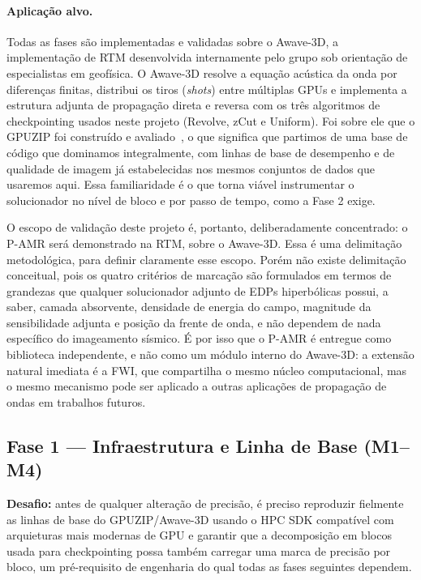\documentclass[12pt,a4paper]{article}
\newcommand{\pamr}{P\nobreakdash-AMR}
\begin{document}
\paragraph{Aplicação alvo.} Todas as fases são implementadas e validadas
sobre o Awave-3D, a implementação de RTM desenvolvida internamente pelo
grupo sob orientação de especialistas em geofísica. O Awave-3D resolve a
equação acústica da onda por diferenças finitas, distribui os tiros
(\emph{shots}) entre múltiplas GPUs e implementa a estrutura adjunta de
propagação direta e reversa com os três algoritmos de checkpointing usados
neste projeto (Revolve, zCut e Uniform). Foi sobre ele que o GPUZIP foi
construído e avaliado~\cite{maltempi2025checkpointing}, o que significa que
partimos de uma base de código que dominamos integralmente, com linhas de
base de desempenho e de qualidade de imagem já estabelecidas nos mesmos
conjuntos de dados que usaremos aqui. Essa familiaridade é o que torna
viável instrumentar o solucionador no nível de bloco e por passo de tempo,
como a Fase 2 exige.

O escopo de validação deste projeto é, portanto, deliberadamente
concentrado: o \pamr{} será demonstrado na RTM, sobre o Awave-3D. Essa
é uma delimitação metodológica, para definir claramente esse escopo.
Porém não existe delimitação conceitual, pois os quatro critérios de marcação
são formulados em termos de grandezas que qualquer solucionador adjunto de
EDPs hiperbólicas possui, a saber, camada absorvente, densidade de energia
do campo, magnitude da sensibilidade adjunta e posição da frente de onda, e
não dependem de nada específico do imageamento sísmico. É por isso que o
\pamr{} é entregue como biblioteca independente, e não como um módulo
interno do Awave-3D: a extensão natural imediata é a FWI, que compartilha o
mesmo núcleo computacional, mas o mesmo mecanismo pode ser aplicado a
outras aplicações de propagação de ondas em trabalhos futuros.

\subsection{Fase 1 --- Infraestrutura e Linha de Base (M1--M4)}

\textbf{Desafio:} antes de qualquer alteração de precisão, é preciso
reproduzir fielmente as linhas de base do GPUZIP/Awave-3D usando o HPC SDK compatível 
com arquieturas mais modernas de GPU e
garantir que a decomposição em blocos usada para checkpointing possa
também carregar uma marca de precisão por bloco, um pré-requisito de
engenharia do qual todas as fases seguintes dependem.
\end{document}
